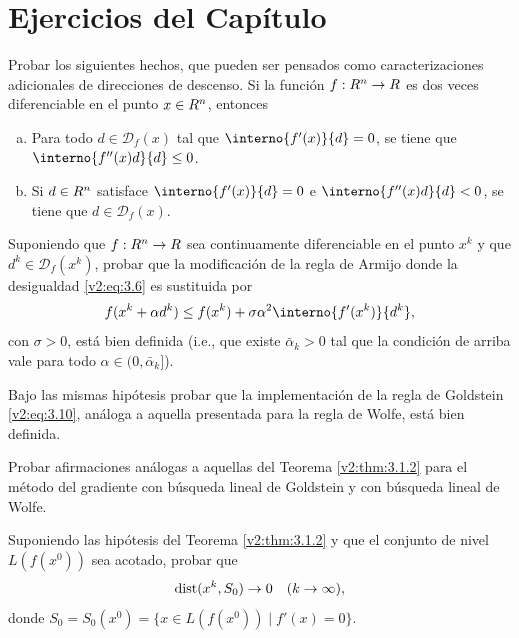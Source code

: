 
\section*{Ejercicios del Capítulo}

\begin{exercise}\label{v2:ejer:3.1.1}
    Probar los siguientes hechos, que pueden ser pensados como caracterizaciones adicionales de direcciones de descenso. Si la función $f : R^n \to R$ es dos veces diferenciable en el punto $x \in R^n$, entonces
    \begin{enumerate}[(a)]
        \item Para todo $d \in \mathcal{D}_f(x)$ tal que $\interno{f'(x)}{d} = 0$, se tiene que $\interno{f''(x)d}{d} \le 0$.
        \item Si $d \in R^n$ satisface $\interno{f'(x)}{d} = 0$ e $\interno{f''(x)d}{d} < 0$, se tiene que $d \in \mathcal{D}_f(x)$.
    \end{enumerate}
\end{exercise}

\begin{exercise}\label{v2:ejer:3.1.2}
    Suponiendo que $f : R^n \to R$ sea continuamente diferenciable en el punto $x^k$ y que $d^k \in \mathcal{D}_f(x^k)$, probar que la modificación de la regla de Armijo donde la desigualdad \eqref{v2:eq:3.6} es sustituida por
    \[
        f(x^k + \alpha d^k) \le f(x^k) + \sigma \alpha^2 \interno{f'(x^k)}{d^k},
    \]
    con $\sigma > 0$, está bien definida (i.e., que existe $\bar{\alpha}_k > 0$ tal que la condición de arriba vale para todo $\alpha \in (0, \bar{\alpha}_k]$).
\end{exercise}

\begin{exercise}\label{v2:ejer:3.1.3}
    Bajo las mismas hipótesis probar que la implementación de la regla de Goldstein \eqref{v2:eq:3.10}, análoga a aquella presentada para la regla de Wolfe, está bien definida.
\end{exercise}

\begin{exercise}\label{v2:ejer:3.1.4}
    Probar afirmaciones análogas a aquellas del Teorema \ref{v2:thm:3.1.2} para el método del gradiente con búsqueda lineal de Goldstein y con búsqueda lineal de Wolfe.
\end{exercise}

\begin{exercise}\label{v2:ejer:3.1.5}
    Suponiendo las hipótesis del Teorema \ref{v2:thm:3.1.2} y que el conjunto de nivel $L(f(x^0))$ sea acotado, probar que
    \[
        \operatorname{dist}(x^k, S_0) \to 0 \quad (k \to \infty),
    \]
    donde $S_0 = S_0(x^0) = \{x \in L(f(x^0)) \mid f'(x) = 0\}$.
\end{exercise}

